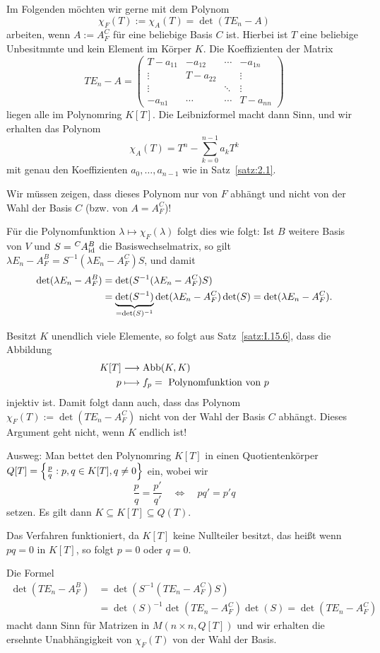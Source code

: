 \begin{problem}
	\label{prob:2.2}
	Im Folgenden möchten wir gerne mit dem Polynom
	\[
		\chi_F(T) := \chi_A(T) = \det(TE_n - A)
	\]
	arbeiten, wenn $A := A_F^C$ für eine beliebige Basis $C$ ist.
	Hierbei ist $T$ eine beliebige Unbesitmmte und kein Element im Körper $K$.
	Die Koeffizienten der Matrix
	\[
		TE_n-A = \begin{pmatrix}
		T-a_{11} & -a_{12} & \cdots & -a_{1n} \\ 
		\vdots & T-a_{22} &  & \vdots \\ 
		\vdots &  & \ddots & \vdots \\ 
		-a_{n1} & \cdots & \cdots & T-a_{nn}
		\end{pmatrix} 
	\]
	liegen alle im Polynomring $K[T]$.
	Die Leibnizformel macht dann Sinn, und wir erhalten das Polynom
	\[
		\chi_A(T) = T^n - \sum_{k=0}^{n-1} a_kT^k
	\]
	mit genau den Koeffizienten $a_0,\dots,a_{n-1}$ wie in Satz~\ref{satz:2.1}.
	
	Wir müssen zeigen, dass dieses Polynom nur von $F$ abhängt und nicht von der Wahl der Basis $C$ (bzw. von $A = A_F^C$)!
	
	Für die Polynomfunktion $\lambda \mapsto \chi_F(\lambda)$ folgt dies wie folgt:
	Ist $B$ weitere Basis von $V$ und $S = \mat{A}{C}{B}{\id}$ die Basiswechselmatrix, so gilt $\lambda E_n - A_F^B = S^{-1}(\lambda E_n - A_F^C)S$, und damit
	\begin{align*}
		\det(\lambda E_n - A_F^B) &= \det(S^{-1}(\lambda E_n-A_F^C)S) \\
		&= {\underbrace{\det(S^{-1})}_{=\det(S)^{-1}}} \det(\lambda E_n - A_F^C) \det(S) = \det(\lambda E_n -A_F^C).
	\end{align*}

	Besitzt $K$ unendlich viele Elemente, so folgt aus Satz~\ref{satz:I.15.6}, dass die Abbildung
	\begin{align*}
		K[T] &\longrightarrow \operatorname{Abb}(K,K) \\
		p &\longmapsto f_p = \text{ Polynomfunktion von } p
	\end{align*}
	injektiv ist.
	Damit folgt dann auch, dass das Polynom $\chi_F(T) := \det(TE_n - A_F^C)$ nicht von der Wahl der Basis $C$ abhängt.
	Dieses Argument geht nicht, wenn $K$ endlich ist!

	Ausweg: Man bettet den Polynomring $K[T]$ in einen Quotientenkörper $Q[T] = \left\{\frac{p}{q} : p,q \in K[T], q \neq 0\right\}$ ein, wobei wir
	\[
		\frac{p}{q} = \frac{p'}{q'} \quad \Leftrightarrow \quad pq' = p'q
	\]
	setzen.
	Es gilt dann $K \subseteq K[T] \subseteq Q(T)$.
	
	Das Verfahren funktioniert, da $K[T]$ keine Nullteiler besitzt, das heißt wenn $pq = 0$ in $K[T]$, so folgt $p = 0$ oder $q=0$.
	
	Die Formel
	\begin{align*}
		\det(TE_n - A_F^B) &= \det(S^{-1}(TE_n - A_F^C)S) \\
		&= \det(S)^{-1} \det(TE_n - A_F^C) \det(S) = \det(TE_n - A_F^C)
	\end{align*}
	macht dann Sinn für Matrizen in $M(n \times n,Q[T])$ und wir erhalten die ersehnte Unabhängigkeit von $\chi_F(T)$ von der Wahl der Basis.
\end{problem}

